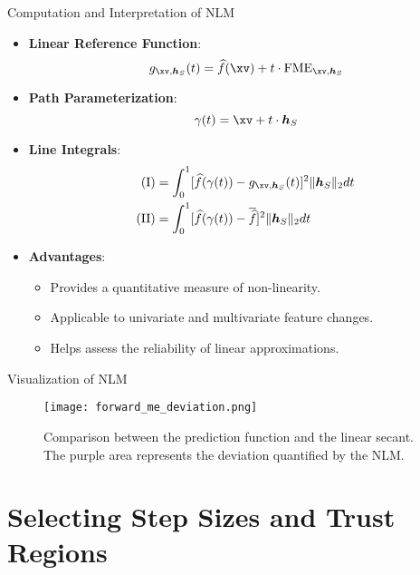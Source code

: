\documentclass[11pt,compress,t,notes=noshow, aspectratio=169, xcolor=table]{beamer}
\newcommand{\boldhS}{\bm{h}_{S}}
\begin{document}
\begin{frame}{Computation and Interpretation of NLM}
\begin{itemize}
\item \textbf{Linear Reference Function}:
\[
g_{\xv, \boldhS}(t) = \widehat{f}(\xv) + t \cdot \text{FME}_{\xv, \boldhS}
\]
\item \textbf{Path Parameterization}:
\[
\gamma(t) = \xv + t \cdot \boldhS
\]
\item \textbf{Line Integrals}:
\begin{align*}
\text{(I)} &= \int_0^1 [\widehat{f}(\gamma(t)) - g_{\xv, \boldhS}(t)]^2 \Vert \boldhS \Vert_2 dt \\
\text{(II)} &= \int_0^1 [\widehat{f}(\gamma(t)) - \overline{\widehat{f}}]^2 \Vert \boldhS \Vert_2 dt
\end{align*}
\item \textbf{Advantages}:
\begin{itemize}
\item Provides a quantitative measure of non-linearity.
\item Applicable to univariate and multivariate feature changes.
\item Helps assess the reliability of linear approximations.
\end{itemize}
\end{itemize}
\end{frame}

\begin{frame}{Visualization of NLM}
\begin{figure}
  \centering
  \texttt{[image: forward\_me\_deviation.png]}
  \caption{Comparison between the prediction function and the linear secant. The purple area represents the deviation quantified by the NLM.}
\end{figure}
\end{frame}

\section{Selecting Step Sizes and Trust Regions}
\end{document}
